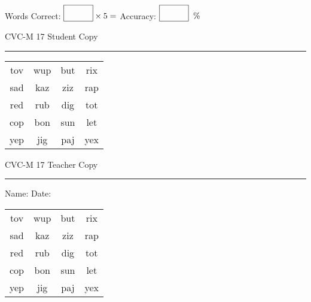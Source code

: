 \documentclass{memoir}
\begin{document}
\small

Words Correct: $\fbox{\phantom{\huge 100}} \times 5 = $ Accuracy: $\fbox{\phantom{\huge 100}}\;\; \%$ 

\vfill

\newpage


\footnotesize \noindent
CVC-M 17 \hfill Student Copy
\smallskip
\hrule

\Large

\setlength{\tabcolsep}{14pt}
\def\arraystretch{2}

{\selectfont


\begin{vplace}[0.5]
\begin{center}
\begin{tabular}{cccc}
tov & wup & but & rix \\
sad & kaz & ziz & rap \\
red & rub & dig & tot \\
cop & bon & sun & let \\
yep & jig & paj & yex \\
\end{tabular}
\end{center}
\end{vplace}

}

\newpage

\footnotesize \noindent
CVC-M 17 \hfill Teacher Copy
\smallskip
\hrule

\small

\vfill

\noindent
Name: \underline{\hspace{1.75in}} \hfill Date: \underline{\hspace{1in}}

\Large

{\selectfont


\begin{vplace}[0.5]
\begin{center}
\begin{tabular}{cccc}
tov & wup & but & rix \\
sad & kaz & ziz & rap \\
red & rub & dig & tot \\
cop & bon & sun & let \\
yep & jig & paj & yex \\
\end{tabular}
\end{center}
\end{vplace}



}
\end{document}
